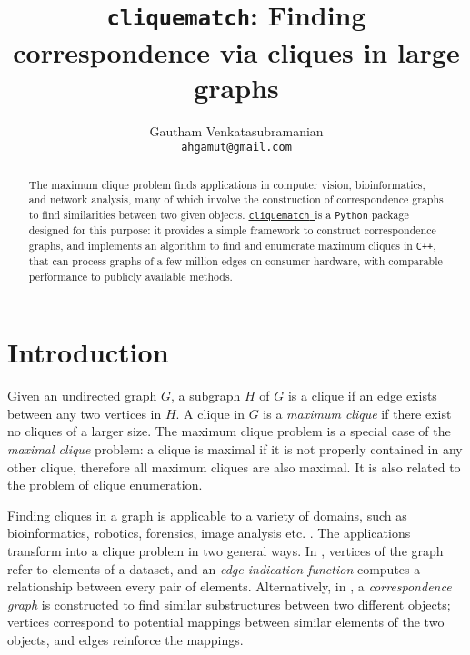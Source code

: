 \documentclass[12pt]{article}
\author{Gautham Venkatasubramanian \\ \texttt{ahgamut@gmail.com}}
\title{\texttt{cliquematch}: Finding correspondence via cliques in large graphs}
\newcommand{\clqm}{\href{https://github.com/ahgamut/cliquematch}{\texttt{cliquematch}~}}
\begin{document}
\maketitle

\begin{abstract}
	The maximum clique problem finds applications in computer vision, bioinformatics, and
	network analysis, many of which involve the construction of correspondence graphs to find
	similarities between two given objects. \clqm is a \texttt{Python} package designed
	for this purpose: it provides a simple framework to construct correspondence graphs, and
	implements an algorithm to find and enumerate maximum cliques in \texttt{C++},
	that can process graphs of a few million edges on consumer hardware, with comparable
	performance to publicly available methods.
\end{abstract}

\tableofcontents

\newpage

\section{Introduction}%
\label{sec:introduction}
Given an undirected graph $G$, a subgraph $H$ of
$G$ is a clique if an edge exists between any two vertices in
$H$. A clique in $G$ is a \textit{maximum clique}
if there exist no cliques of a larger size. The maximum clique problem
\citep{bomze1999} is a special case of the \textit{maximal clique} problem: a clique
is maximal if it is not properly contained in any other clique, therefore all maximum
cliques are also maximal. It is also related to the problem of clique enumeration.

Finding cliques in a graph is applicable to a variety of domains, such as bioinformatics,
robotics, forensics, image analysis  etc. \citep{conte2004}. The applications
transform into a clique problem in two general ways. In \citep{pradalier2003}, vertices
of the graph refer to elements of a dataset, and an \textit{edge indication function} computes a
relationship between every pair of elements. Alternatively, in \citep{horaud1989}, a
\textit{correspondence graph} is constructed to find similar substructures between two different
objects; vertices correspond to potential mappings between similar elements of the two
objects, and edges reinforce the mappings.
\end{document}
